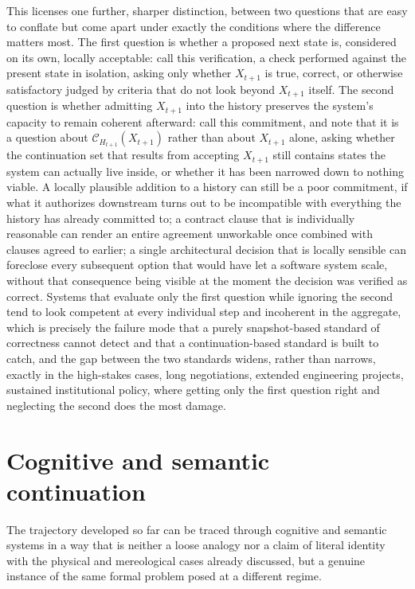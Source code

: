 \documentclass[11pt]{article}
\begin{document}
This licenses one further, sharper distinction, between two questions that are easy to conflate but come apart under exactly the conditions where the difference matters most. The first question is whether a proposed next state is, considered on its own, locally acceptable: call this verification, a check performed against the present state in isolation, asking only whether $X_{t+1}$ is true, correct, or otherwise satisfactory judged by criteria that do not look beyond $X_{t+1}$ itself. The second question is whether admitting $X_{t+1}$ into the history preserves the system's capacity to remain coherent afterward: call this commitment, and note that it is a question about $\mathcal{C}_{H_{t+1}}(X_{t+1})$ rather than about $X_{t+1}$ alone, asking whether the continuation set that results from accepting $X_{t+1}$ still contains states the system can actually live inside, or whether it has been narrowed down to nothing viable. A locally plausible addition to a history can still be a poor commitment, if what it authorizes downstream turns out to be incompatible with everything the history has already committed to; a contract clause that is individually reasonable can render an entire agreement unworkable once combined with clauses agreed to earlier; a single architectural decision that is locally sensible can foreclose every subsequent option that would have let a software system scale, without that consequence being visible at the moment the decision was verified as correct. Systems that evaluate only the first question while ignoring the second tend to look competent at every individual step and incoherent in the aggregate, which is precisely the failure mode that a purely snapshot-based standard of correctness cannot detect and that a continuation-based standard is built to catch, and the gap between the two standards widens, rather than narrows, exactly in the high-stakes cases, long negotiations, extended engineering projects, sustained institutional policy, where getting only the first question right and neglecting the second does the most damage.

\section{Cognitive and semantic continuation}

The trajectory developed so far can be traced through cognitive and semantic systems in a way that is neither a loose analogy nor a claim of literal identity with the physical and mereological cases already discussed, but a genuine instance of the same formal problem posed at a different regime.
\end{document}
